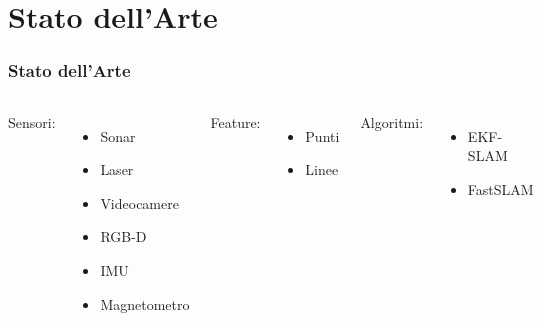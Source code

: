 \documentclass[c]{beamer}
\begin{document}
\section{Stato dell'Arte}
\begin{frame}
\frametitle{Stato dell'Arte}


\begin{columns}[c, onlytextwidth]
Sensori:
\begin{itemize}
 \item Sonar
 \item Laser
 \item Videocamere
 \item RGB-D
 \item IMU
 \item Magnetometro
 \end{itemize}

Feature:
\begin{itemize}
 \item Punti
 \item Linee
\end{itemize}

Algoritmi:
\begin{itemize}
 \item EKF-SLAM
 \item FastSLAM
\end{itemize}


\includegraphics[width=0.9\textwidth]{immagini/stereo} \\
\vskip 0.5cm
\includegraphics[width=0.9\textwidth]{immagini/ptam}



\end{columns}
\end{frame}
\end{document}
